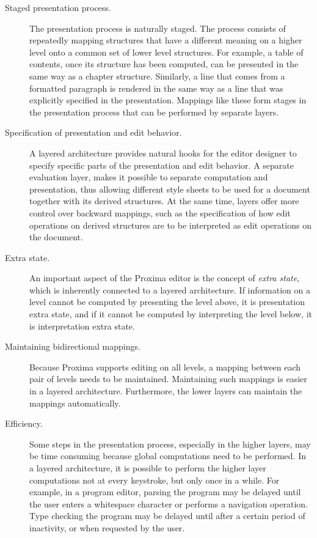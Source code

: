 \documentclass{speauth}
\begin{document}
\begin{description}

\item[Staged presentation process.]
The presentation process is naturally staged. The process consists of repeatedly mapping  structures that have a different meaning on a higher level onto a common set of lower level structures. For example, a table of contents, once its structure has been computed, can be presented in the same way as a chapter structure. Similarly, a line that comes from a formatted paragraph is rendered in the same way as a line that was explicitly specified in the presentation. Mappings like these form stages in the presentation process that can be performed by separate layers.

\item[Specification of presentation and edit behavior.]
A layered architecture provides natural hooks for the editor designer to specify specific parts of the presentation and edit behavior. A separate evaluation layer, makes it possible to separate computation and presentation, thus allowing different style sheets to be used for a document together with its derived structures. At the same time, layers offer more control over backward mappings, such as the specification of how edit operations on derived structures are to be interpreted as edit operations on the document.

\item[Extra state.]
An important aspect of the Proxima editor is the concept of {\em extra state}, which is inherently connected to a layered architecture. If information on a level cannot be computed by presenting the level above, it is presentation extra state, and if it cannot be computed by interpreting the level below, it is interpretation extra state.

\item[Maintaining bidirectional mappings.]
Because Proxima supports editing on all levels, a mapping between each pair of levels needs to be maintained. Maintaining such mappings is easier in a layered architecture. Furthermore, the lower layers can maintain the mappings automatically.

\item[Efficiency.]
Some steps in the presentation process, especially in the higher layers, may be time consuming because global computations need to be performed. In a layered architecture, it is possible to perform the higher layer computations not at every keystroke, but only once in a while. For example, in a program editor, parsing the program may be delayed until the user enters a whitespace character or performs a navigation operation. Type checking the program may be delayed until after a certain period of inactivity, or when requested by the user.
\end{description}
\end{document}
